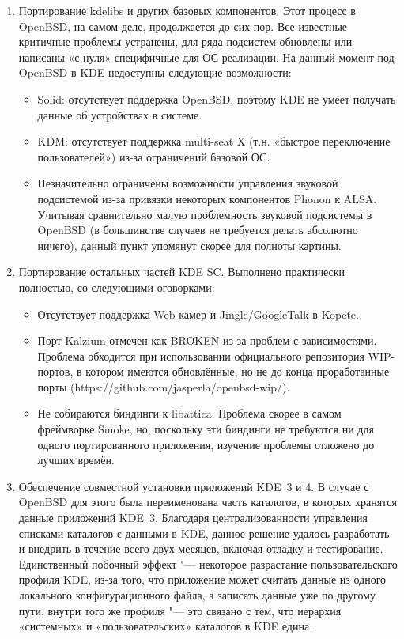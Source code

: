 \documentclass[10pt, a5paper]{article}
\begin{document}
\begin{enumerate}
 \item Портирование kdelibs и других базовых компонентов. Этот процесс в OpenBSD, на самом деле, продолжается до сих пор. Все известные критичные проблемы устранены, для ряда подсистем обновлены или написаны «с нуля» специфичные для ОС реализации. На данный момент под OpenBSD в KDE недоступны следующие возможности:
\begin{itemize}
 \item Solid: отсутствует поддержка OpenBSD, поэтому KDE не умеет получать данные об устройствах в системе.
 \item KDM: отсутствует поддержка multi-seat X (т.н. «быстрое переключение пользователей») из-за ограничений базовой ОС.
 \item Незначительно ограничены возможности управления звуковой подсистемой из-за привязки некоторых компонентов Phonon к ALSA. Учитывая сравнительно малую проблемность звуковой подсистемы в OpenBSD (в большинстве случаев не требуется делать абсолютно ничего), данный пункт упомянут скорее для полноты картины.
\end{itemize}
 \item Портирование остальных частей KDE SC. Выполнено практически полностью, со следующими оговорками:
\begin{itemize}
 \item Отсутствует поддержка Web-камер и Jingle/GoogleTalk в Kopete.
 \item Порт Kalzium отмечен как BROKEN из-за проблем с зависимостями. Проблема обходится при использовании \linebreak официального репозитория WIP-портов, в котором имеются обновлённые, но не до конца проработанные порты (https://github.com/jas\-per\-la/open\-bsd-wip/).
 \item Не собираются биндинги к libattica. Проблема скорее в самом фреймворке Smoke, но, поскольку эти биндинги не требуются ни для одного портированного приложения, изучение проблемы отложено до лучших времён.
\end{itemize}
 \item Обеспечение совместной установки приложений KDE~3 и 4. В случае с OpenBSD для этого была переименована часть каталогов, в которых хранятся данные приложений KDE~3. Благодаря централизованности управления списками каталогов с данными в KDE, данное решение удалось разработать и внедрить в течение всего двух месяцев, включая отладку и тестирование. Единственный побочный эффект "--- некоторое разрастание пользовательского профиля KDE, из-за того, что приложение может считать данные из одного локального конфигурационного файла, а записать данные уже по другому пути, внутри того же профиля "--- это связано с тем, что иерархия «системных» и «пользовательских» каталогов в KDE едина.


\end{enumerate}
\end{document}
